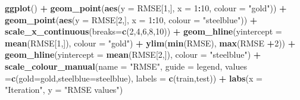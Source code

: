 \documentclass[
]{book}
\newenvironment{Shaded}{\begin{snugshade}}{\end{snugshade}}
\newcommand{\AttributeTok}[1]{\textcolor[rgb]{0.13,0.29,0.53}{#1}}
\newcommand{\DecValTok}[1]{\textcolor[rgb]{0.00,0.00,0.81}{#1}}
\newcommand{\FunctionTok}[1]{\textcolor[rgb]{0.13,0.29,0.53}{\textbf{#1}}}
\newcommand{\NormalTok}[1]{#1}
\newcommand{\OtherTok}[1]{\textcolor[rgb]{0.56,0.35,0.01}{#1}}
\newcommand{\SpecialCharTok}[1]{\textcolor[rgb]{0.81,0.36,0.00}{\textbf{#1}}}
\newcommand{\StringTok}[1]{\textcolor[rgb]{0.31,0.60,0.02}{#1}}
\begin{document}
\begin{Shaded}
\begin{Highlighting}[]
\FunctionTok{ggplot}\NormalTok{() }\SpecialCharTok{+}
  \FunctionTok{geom\_point}\NormalTok{(}\FunctionTok{aes}\NormalTok{(}\AttributeTok{y =}\NormalTok{ RMSE[}\DecValTok{1}\NormalTok{,],}
                 \AttributeTok{x =} \DecValTok{1}\SpecialCharTok{:}\DecValTok{10}\NormalTok{, }\AttributeTok{colour =} \StringTok{"gold"}\NormalTok{)) }\SpecialCharTok{+}
  \FunctionTok{geom\_point}\NormalTok{(}\FunctionTok{aes}\NormalTok{(}\AttributeTok{y =}\NormalTok{ RMSE[}\DecValTok{2}\NormalTok{,],}
                 \AttributeTok{x =} \DecValTok{1}\SpecialCharTok{:}\DecValTok{10}\NormalTok{, }\AttributeTok{colour =} \StringTok{"steelblue"}\NormalTok{)) }\SpecialCharTok{+}
  \FunctionTok{scale\_x\_continuous}\NormalTok{(}\AttributeTok{breaks=}\FunctionTok{c}\NormalTok{(}\DecValTok{2}\NormalTok{,}\DecValTok{4}\NormalTok{,}\DecValTok{6}\NormalTok{,}\DecValTok{8}\NormalTok{,}\DecValTok{10}\NormalTok{)) }\SpecialCharTok{+}
  \FunctionTok{geom\_hline}\NormalTok{(}\AttributeTok{yintercept =} \FunctionTok{mean}\NormalTok{(RMSE[}\DecValTok{1}\NormalTok{,]),}
             \AttributeTok{colour =} \StringTok{"gold"}\NormalTok{) }\SpecialCharTok{+}
  \FunctionTok{ylim}\NormalTok{(}\FunctionTok{min}\NormalTok{(RMSE), }\FunctionTok{max}\NormalTok{(RMSE }\SpecialCharTok{+}\DecValTok{2}\NormalTok{)) }\SpecialCharTok{+}
  \FunctionTok{geom\_hline}\NormalTok{(}\AttributeTok{yintercept =} \FunctionTok{mean}\NormalTok{(RMSE[}\DecValTok{2}\NormalTok{,]),}
             \AttributeTok{colour =} \StringTok{"steelblue"}\NormalTok{) }\SpecialCharTok{+}
  \FunctionTok{scale\_colour\_manual}\NormalTok{(}\AttributeTok{name =} \StringTok{"RMSE"}\NormalTok{, }\AttributeTok{guide =} \StringTok{\textquotesingle{}legend\textquotesingle{}}\NormalTok{,}
                      \AttributeTok{values =}\FunctionTok{c}\NormalTok{(}\StringTok{\textquotesingle{}gold\textquotesingle{}}\OtherTok{=}\StringTok{\textquotesingle{}gold\textquotesingle{}}\NormalTok{,}\StringTok{\textquotesingle{}steelblue\textquotesingle{}}\OtherTok{=}\StringTok{\textquotesingle{}steelblue\textquotesingle{}}\NormalTok{), }
                      \AttributeTok{labels =} \FunctionTok{c}\NormalTok{(}\StringTok{\textquotesingle{}train\textquotesingle{}}\NormalTok{,}\StringTok{\textquotesingle{}test\textquotesingle{}}\NormalTok{)) }\SpecialCharTok{+}
  \FunctionTok{labs}\NormalTok{(}\AttributeTok{x =} \StringTok{"Iteration"}\NormalTok{, }\AttributeTok{y =} \StringTok{"RMSE values"}\NormalTok{)}
\end{Highlighting}
\end{Shaded}
\end{document}
